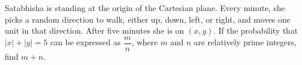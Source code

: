 Satabhisha is standing at the origin of the Cartesian plane. Every minute, she picks a random direction to walk, either up, down, left, or right, and moves one unit in that direction. After five minutes she is on $(x,y)$. If the probability that $|x|+|y|=5$ can be expressed as $\dfrac{m}{n}$, where $m$ and $n$ are relatively prime integers, find $m+n$.
